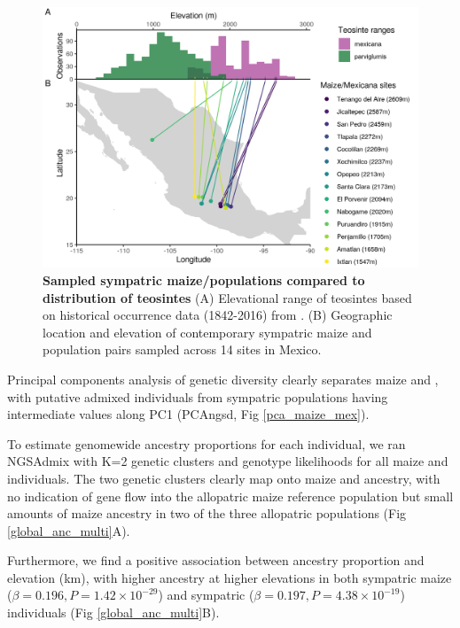 \begin{figure}[ht]
\includegraphics[width=\textwidth]{chapter2/figures/mexico_lines_elev_teo_color.png}
\caption{\color{Gray} \textbf{Sampled sympatric maize/\mexicana populations compared to distribution of teosintes} (A) Elevational range of teosintes based on historical occurrence data (1842-2016) from \cite{Gonzalez:2018}. (B) Geographic location and elevation of contemporary sympatric maize and \mexicana population pairs sampled across 14 sites in Mexico.}
\label{map}
\end{figure}

Principal components analysis of genetic diversity clearly separates maize and \mexicana, with putative admixed individuals from sympatric populations having intermediate values along PC1 (PCAngsd, Fig \ref{pca_maize_mex}). 

To estimate genomewide ancestry proportions for each individual, we ran NGSAdmix \cite{Skotte:2013_NGSadmix} with K=2 genetic clusters and genotype likelihoods for all maize and \mexicana individuals.
The two genetic clusters clearly map onto maize and \mexicana ancestry, with no indication of gene flow into the allopatric maize reference population but small amounts of maize ancestry in two of the three allopatric \mexicana populations (Fig \ref{global_anc_multi}A). 

Furthermore, we find a positive association between ancestry proportion and elevation (km), with higher \mexicana ancestry at higher elevations in both sympatric maize ($\beta=0.196, P = 1.42 \times 10^{-29}$) and sympatric \mexicana ($\beta=0.197, P = 4.38 \times 10^{-19}$) individuals (Fig \ref{global_anc_multi}B).

